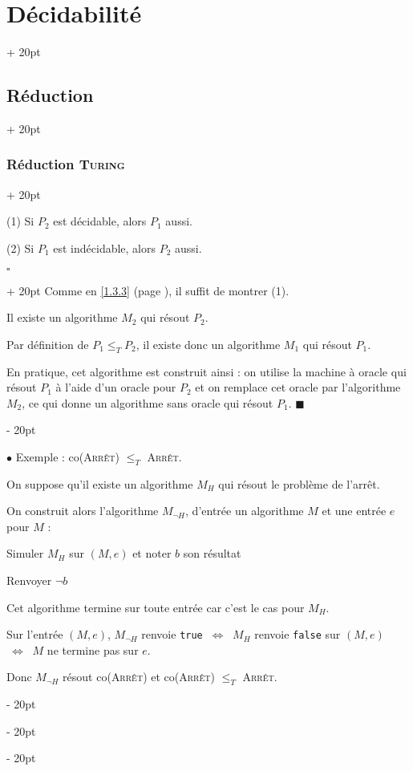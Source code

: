 \documentclass[a4paper, 12pt, twoside]{article}
\newenvironment{indalgo}[2][H]{
    \begin{algoBox}
        \begin{algorithm}[#1]
            \caption{#2}
}
{
        \end{algorithm}
    \end{algoBox}
}
\newcommand{\ssi}{\ \Leftrightarrow \ }
\renewcommand{\le}{\leqslant}
\newcommand{\ind}[1][20pt]{\advance\leftskip + #1}
\newcommand{\deind}[1][20pt]{\advance\leftskip - #1}
\newenvironment{indt}[2][20pt]{#2 \par \ind[#1]}{\par \deind} %
\newenvironment{proof}[1][{}]{\begin{indt}{$\square$ #1}}{$\blacksquare$ \end{indt}}
\begin{document}
\begin{indt}{\section{Décidabilité}}
\begin{indt}{\subsection{Réduction}}
\begin{indt}{\subsubsection{Réduction \textsc{Turing}}}
\begin{emphBox}
                    (1) Si $P_2$ est décidable, alors $P_1$ aussi.

                    (2) Si $P_1$ est indécidable, alors $P_2$ aussi.
                \end{emphBox}

                \vspace{12pt}
                
                \begin{proof}
                    Comme en \ref{1.3.3} (page \pageref{1.3.3}), il suffit de montrer (1).

                    Il existe un algorithme $M_2$ qui résout $P_2$.

                    Par définition de $P_1 \le_T P_2$, il existe donc un algorithme $M_1$ qui résout $P_1$.

                    En pratique, cet algorithme est construit ainsi : on utilise la machine à oracle qui résout $P_1$ à l'aide d'un oracle pour $P_2$ et on remplace cet oracle par l'algorithme $M_2$, ce qui donne un algorithme sans oracle qui résout $P_1$.
                \end{proof}

                \vspace{12pt}
                
                $\bullet$ Exemple : co(\textsc{Arrêt}) $\le_T$ \textsc{Arrêt}.

                On suppose qu'il existe un algorithme $M_H$ qui résout le problème de l'arrêt.

                On construit alors l'algorithme $M_{\neg H}$, d'entrée un algorithme $M$ et une entrée $e$ pour $M$ :

                \begin{indalgo}{}
                    Simuler $M_H$ sur $(M, e)$ et noter $b$ son résultat\;

                    Renvoyer $\neg b$\;
                \end{indalgo}

                Cet algorithme termine sur toute entrée car c'est le cas pour $M_H$.

                Sur l'entrée $(M, e)$, $M_{\neg H}$ renvoie \texttt{true} $\ssi$ $M_H$ renvoie \texttt{false} sur $(M, e)$ $\ssi$ $M$ ne termine pas sur $e$.

                Donc $M_{\neg H}$ résout co(\textsc{Arrêt}) et co(\textsc{Arrêt}) $\le_T$ \textsc{Arrêt}.

                \vspace{12pt}
                

\end{indt}
\end{indt}
\end{indt}
\end{document}

